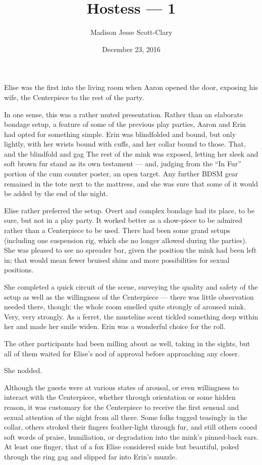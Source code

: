 \documentclass[12pt,letterpaper,oneside]{memoir}
\title{Hostess --- 1}
\author{Madison Jesse Scott-Clary}
\date{December 23, 2016}
\begin{document}
  \maketitle

  Elise was the first into the living room when Aaron opened the door, exposing his wife, the Centerpiece to the rest of the party.

  In one sense, this was a rather muted presentation. Rather than an elaborate bondage setup, a feature of some of the previous play parties, Aaron and Erin had opted for something simple. Erin was blindfolded and bound, but only lightly, with her wrists bound with cuffs, and her collar bound to those. That, and the blindfold and gag The rest of the mink was exposed, letting her sleek and soft brown fur stand as its own testament --- and, judging from the ``In Fur'' portion of the cum counter poster, an open target. Any further BDSM gear remained in the tote next to the mattress, and she was sure that some of it would be added by the end of the night.

  Elise rather preferred the setup. Overt and complex bondage had its place, to be sure, but not in a play party. It worked better as a show-piece to be admired rather than a Centerpiece to be used. There had been some grand setups (including one suspension rig, which she no longer allowed during the parties). She was pleased to see no spreader bar, given the position the mink had been left in; that would mean fewer bruised shins and more possibilities for sexual positions.

  She completed a quick circuit of the scene, surveying the quality and safety of the setup as well as the willingness of the Centerpiece --- there was little observation needed there, though: the whole room smelled quite strongly of aroused mink. Very, very strongly. As a ferret, the musteline scent tickled something deep within her and made her smile widen. Erin was a wonderful choice for the roll.

  The other participants had been milling about as well, taking in the sights, but all of them waited for Elise's nod of approval before approaching any closer.

  She nodded.

  Although the guests were at various states of arousal, or even willingness to interact with the Centerpiece, whether through orientation or some hidden reason, it was customary for the Centerpiece to receive the first sensual and sexual attention of the night from all there. Some folks tugged teasingly in the collar, others stroked their fingers feather-light through fur, and still others cooed soft words of praise, humiliation, or degradation into the mink's pinned-back ears. At least one finger, that of a fox Elise considered snide but beautiful, poked through the ring gag and slipped far into Erin's muzzle.
\end{document}
